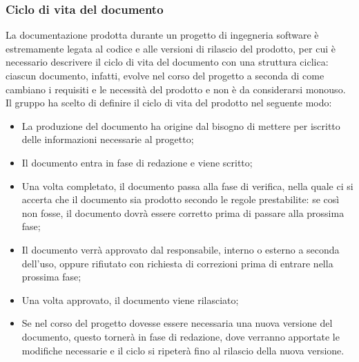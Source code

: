 \subsubsection{Ciclo di vita del documento}
La documentazione prodotta durante un progetto di ingegneria software è estremamente legata al codice e alle versioni di rilascio del prodotto, per cui è necessario descrivere il ciclo di vita del documento con una struttura ciclica: ciascun documento, infatti, evolve nel corso del progetto a seconda di come cambiano i requisiti e le necessità del prodotto e non è da considerarsi monouso.
Il gruppo ha scelto di definire il ciclo di vita del prodotto nel seguente modo:
\begin{itemize}
    \item La produzione del documento ha origine dal bisogno di mettere per iscritto delle informazioni necessarie al progetto;
    \item Il documento entra in fase di redazione e viene scritto;
    \item Una volta completato, il documento passa alla fase di verifica, nella quale ci si accerta che il documento sia prodotto secondo le regole prestabilite: se così non fosse, il documento dovrà essere corretto prima di passare alla prossima fase;
    \item Il documento verrà approvato dal responsabile, interno o esterno a seconda dell'uso, oppure rifiutato con richiesta di correzioni prima di entrare nella prossima fase;
    \item Una volta approvato, il documento viene rilasciato;
    \item Se nel corso del progetto dovesse essere necessaria una nuova versione del documento, questo tornerà in fase di redazione, dove verranno apportate le modifiche necessarie e il ciclo si ripeterà fino al rilascio della nuova versione.
\end{itemize}
